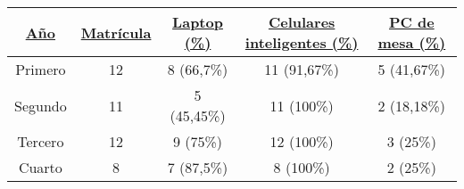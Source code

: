 \begin{longtable}{|c|c|c|c|c|}
	\hline
	 \underline{\textbf{Año}} & \underline{\textbf{Matrícula}} & \underline{\textbf{Laptop (\%)}} & \underline{\textbf{Celulares inteligentes (\%)}} & \underline{\textbf{PC de mesa (\%)}}\\ \hline
	 Primero & 12 & 8 (66,7\%)& 11 (91,67\%) & 5 (41,67\%)\\ \hline
	  Segundo & 11 & 5 (45,45\%) &11 (100\%) & 2 (18,18\%)\\ \hline
	   Tercero & 12 & 9 (75\%)&12 (100\%) & 3 (25\%)\\ \hline
	    Cuarto & 8 & 7 (87,5\%) & 8 (100\%) & 2 (25\%)\\ 
	\hline
\end{longtable}